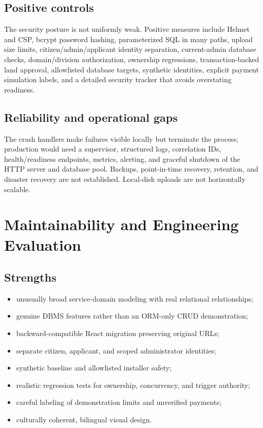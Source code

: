\documentclass[12pt,a4paper,oneside]{report}
\begin{document}
\section{Positive controls}

The security posture is not uniformly weak. Positive measures include Helmet and CSP, bcrypt
password hashing, parameterized SQL in many paths, upload size limits, citizen/admin/applicant
identity separation, current-admin database checks, domain/division authorization, ownership
regressions, transaction-backed land approval, allowlisted database targets, synthetic identities,
explicit payment simulation labels, and a detailed security tracker that avoids overstating
readiness.

\section{Reliability and operational gaps}

The crash handlers make failures visible locally but terminate the process; production would need
a supervisor, structured logs, correlation IDs, health/readiness endpoints, metrics, alerting, and
graceful shutdown of the HTTP server and database pool. Backups, point-in-time recovery, retention,
and disaster recovery are not established. Local-disk uploads are not horizontally scalable.

\chapter{Maintainability and Engineering Evaluation}

\section{Strengths}

\begin{itemize}
  \item unusually broad service-domain modeling with real relational relationships;
  \item genuine DBMS features rather than an ORM-only CRUD demonstration;
  \item backward-compatible React migration preserving original URLs;
  \item separate citizen, applicant, and scoped administrator identities;
  \item synthetic baseline and allowlisted installer safety;
  \item realistic regression tests for ownership, concurrency, and trigger authority;
  \item careful labeling of demonstration limits and unverified payments;
  \item culturally coherent, bilingual visual design.
\end{itemize}
\end{document}
